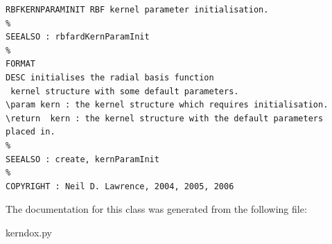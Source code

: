 \footnotesize\begin{verbatim}RBFKERNPARAMINIT RBF kernel parameter initialisation.
%
SEEALSO : rbfardKernParamInit
%
FORMAT
DESC initialises the radial basis function
 kernel structure with some default parameters.
\param kern : the kernel structure which requires initialisation.
\return  kern : the kernel structure with the default parameters placed in.
%
SEEALSO : create, kernParamInit
%
COPYRIGHT : Neil D. Lawrence, 2004, 2005, 2006

\end{verbatim}
\normalsize
 

The documentation for this class was generated from the following file:\begin{CompactItemize}
\item 
kerndox.py\end{CompactItemize}
